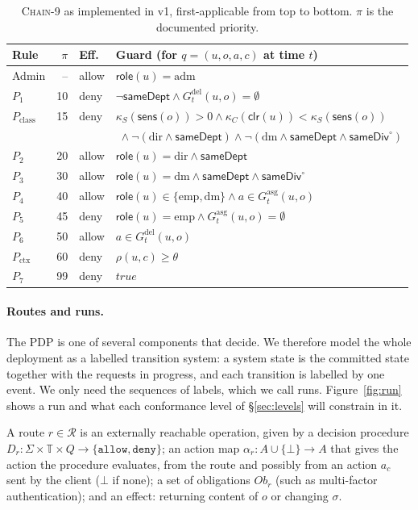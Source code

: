 \documentclass[sigconf,review,anonymous]{acmart}
\newcommand{\chain}{\textsc{Chain-9}\xspace}
\newcommand{\Pc}{P_{\mathrm{class}}}
\newcommand{\Px}{P_{\mathrm{ctx}}}
\newcommand{\Gasg}{G^{\mathrm{asg}}}
\newcommand{\Gdel}{G^{\mathrm{del}}}
\newcommand{\sameDept}{\mathsf{sameDept}}
\newcommand{\sameDiv}{\mathsf{sameDiv}}
\newcommand{\role}{\mathsf{role}}
\newcommand{\allowv}{\mathtt{allow}}
\newcommand{\denyv}{\mathtt{deny}}
\newcommand{\emp}{\mathrm{emp}}
\newcommand{\Routes}{\mathcal{R}}
\begin{document}
\begin{table}[t]
\caption{\chain as implemented in v1, first-applicable from top to bottom. $\pi$ is the documented priority.}
\label{tab:chain}
\small
\begin{tabular}{@{}l@{\;}r@{\;}l@{\;}l@{}}
\toprule
Rule & $\pi$ & Eff. & Guard (for $q=(u,o,a,c)$ at time $t$) \\
\midrule
Admin & -- & allow & $\role(u)=\mathrm{adm}$ \\
$P_1$ & 10 & deny & $\neg\sameDept\wedge\Gdel_t(u,o)=\emptyset$ \\
$\Pc$ & 15 & deny & $\kappa_S(\mathsf{sens}(o))>0\wedge\kappa_C(\mathsf{clr}(u))<\kappa_S(\mathsf{sens}(o))$ \\
 & & & $\;\wedge\neg(\mathrm{dir}\wedge\sameDept)\wedge\neg(\mathrm{dm}\wedge\sameDept\wedge\sameDiv^\circ)$ \\
$P_2$ & 20 & allow & $\role(u)=\mathrm{dir}\wedge\sameDept$ \\
$P_3$ & 30 & allow & $\role(u)=\mathrm{dm}\wedge\sameDept\wedge\sameDiv^\circ$ \\
$P_4$ & 40 & allow & $\role(u)\in\{\emp,\mathrm{dm}\}\wedge a\in\Gasg_t(u,o)$ \\
$P_5$ & 45 & deny & $\role(u)=\emp\wedge\Gasg_t(u,o)=\emptyset$ \\
$P_6$ & 50 & allow & $a\in\Gdel_t(u,o)$ \\
$\Px$ & 60 & deny & $\rho(u,c)\ge\theta$ \\
$P_7$ & 99 & deny & $\mathit{true}$ \\
\bottomrule
\end{tabular}
\end{table}

\paragraph{Routes and runs.} The PDP is one of several components that decide. We therefore model the
whole deployment as a labelled transition system: a system state is the committed state together with the
requests in progress, and each transition is labelled by one event. We only need the sequences of labels,
which we call runs. Figure~\ref{fig:run} shows a run and what each conformance level of \S\ref{sec:levels}
will constrain in it.

\begin{definition}[Routes]\label{def:routes}
A route $r\in\Routes$ is an externally reachable operation, given by a decision procedure
$D_r:\Sigma\times\mathbb{T}\times Q\to\{\allowv,\denyv\}$; an action map $\alpha_r:A\cup\{\bot\}\to A$ that gives
the action the procedure evaluates, from the route and possibly from an action $a_c$ sent by the client ($\bot$
if none); a set of obligations $\mathit{Ob}_r$ (such as multi-factor authentication); and an effect: returning
content of $o$ or changing $\sigma$.
\end{definition}
\end{document}
